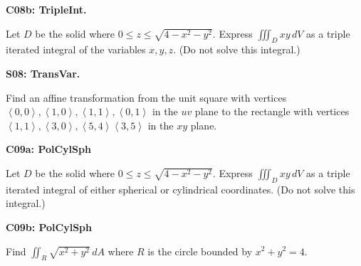 \documentclass[12pt]{article}
\newcommand{\vect}{\mathbf}
\newcommand{\<}{\left\langle}
\renewcommand{\>}{\right\rangle}
\newcommand{\exerciseHeader}[4]{


  \vspace{0.5em}
  \textbf{#2}
  \vspace{0.5em}

}
\begin{document}
\begin{multicols}{2}
\exerciseHeader{2017 July 10}{C08b: TripleInt.}{
Compute and apply triple integrals.
}{4/4}

Let \(D\) be the solid where \(0\leq z\leq\sqrt{4-x^2-y^2}\).
Express \(\iiint_D xy\,dV\) as a triple iterated integral
of the variables \(x,y,z\). (Do not solve this integral.)



%

\exerciseHeader{2017 July 11}{S08: TransVar.}{
Compute and apply a transformation of variables.
}{2/3}

Find an affine transformation from the unit square with vertices
\(\<0,0\>,\<1,0\>,\<1,1\>,\<0,1\>\) in the \(uv\) plane to the rectangle
with vertices
\(\<1,1\>,\<3,0\>,\<5,4\>\<3,5\>\) in the \(xy\) plane.

%



\exerciseHeader{2017 July 12}{C09a: PolCylSph}{
Apply polar, cylindrical, and spherical transformations of variables.
}{1/4}

Let \(D\) be the solid where \(0\leq z\leq\sqrt{4-x^2-y^2}\).
Express \(\iiint_D xy\,dV\) as a triple iterated integral
of either spherical or cylindrical coordinates. (Do not solve this integral.)
\columnbreak


\exerciseHeader{2017 July 13}{C09b: PolCylSph}{
Apply polar, cylindrical, and spherical transformations of variables.
}{2/4}

Find \(\iint_R\sqrt{x^2+y^2}\,dA\) where \(R\) is the circle bounded by
\(x^2+y^2=4\).

%


\end{multicols}
\end{document}
